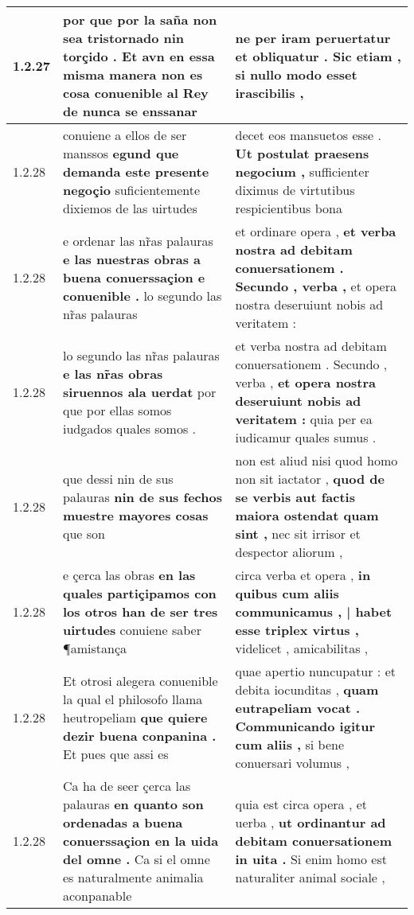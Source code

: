 \begin{tabular}{|p{1cm}|p{6.5cm}|p{6.5cm}|}
1.2.27 & por que por la saña non sea tristornado nin torçido . \textbf{ Et avn en essa misma manera non es cosa conuenible al Rey } de nunca se enssanar & ne per iram peruertatur \textbf{ et obliquatur . Sic etiam , } si nullo modo esset irascibilis , \\\hline
1.2.28 & conuiene a ellos de ser manssos \textbf{ egund que demanda este presente negoçio } suficientemente dixiemos de las uirtudes & decet eos mansuetos esse . \textbf{ Ut postulat praesens negocium , } sufficienter diximus de virtutibus respicientibus bona \\\hline
1.2.28 & e ordenar las nr̃as palauras \textbf{ e las nuestras obras a buena conuerssaçion e conuenible . } lo segundo las nr̃as palauras & et ordinare opera , \textbf{ et verba nostra ad debitam conuersationem . Secundo , verba , } et opera nostra deseruiunt nobis ad veritatem : \\\hline
1.2.28 & lo segundo las nr̃as palauras \textbf{ e las nr̃as obras siruennos ala uerdat } por que por ellas somos iudgados quales somos . & et verba nostra ad debitam conuersationem . Secundo , verba , \textbf{ et opera nostra deseruiunt nobis ad veritatem : } quia per ea iudicamur quales sumus . \\\hline
1.2.28 & que dessi nin de sus palauras \textbf{ nin de sus fechos muestre mayores cosas } que son & non est aliud nisi quod homo non sit iactator , \textbf{ quod de se verbis aut factis maiora ostendat quam sint , } nec sit irrisor et despector aliorum , \\\hline
1.2.28 & e çerca las obras \textbf{ en las quales partiçipamos con los otros han de ser tres uirtudes } conuiene saber ¶amistança & circa verba et opera , \textbf{ in quibus cum aliis communicamus , | habet esse triplex virtus , } videlicet , amicabilitas , \\\hline
1.2.28 & Et otrosi alegera conuenible la qual el philosofo llama heutropeliam \textbf{ que quiere dezir buena conpanina . } Et pues que assi es & quae apertio nuncupatur : et debita iocunditas , \textbf{ quam eutrapeliam vocat . Communicando igitur cum aliis , } si bene conuersari volumus , \\\hline
1.2.28 & Ca ha de seer çerca las palauras \textbf{ en quanto son ordenadas a buena conuerssaçion en la uida del omne . } Ca si el omne es naturalmente animalia aconpanable & quia est circa opera , et uerba , \textbf{ ut ordinantur ad debitam conuersationem in uita . } Si enim homo est naturaliter animal sociale , \\\hline

\end{tabular}
